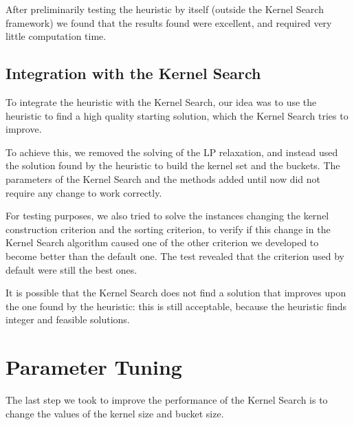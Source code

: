 After preliminarily testing the heuristic by itself (outside the Kernel Search framework)
we found that the results found were excellent, and required very little computation time.

\subsection{Integration with the Kernel Search}
To integrate the heuristic with the Kernel Search, our idea was to use the heuristic
to find a high quality starting solution, which the Kernel Search tries to improve.

To achieve this, we removed the solving of the LP relaxation, and instead
used the solution found by the heuristic to build the kernel set and the buckets.
The parameters of the Kernel Search and the methods added until now
did not require any change to work correctly.

For testing purposes, we also tried to solve the instances changing the kernel construction
criterion and the sorting criterion, to verify if this change in the
Kernel Search algorithm caused one of the other criterion we developed
to become better than the default one.
The test revealed that the criterion used by default were still the best ones.

It is possible that the Kernel Search does not find a solution that improves
upon the one found by the heuristic: this is still acceptable, because the
heuristic finds integer and feasible solutions.


\section{Parameter Tuning}
The last step we took to improve the performance of the Kernel Search is to
change the values of the kernel size and bucket size.

